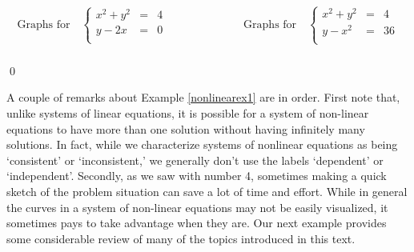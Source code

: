 \begin{ex}
\begin{enumerate}
\[\begin{array}{cc}
\text{Graphs for} \quad \left\{\begin{array}{rcr}  x^2 +y^2 & = & 4 \\ y-2x & = & 0 \\ \end{array} \right.

&

\hspace{1in}

\text{Graphs for} \quad \left\{\begin{array}{rcr}  x^2 +y^2 & = & 4 \\ y-x^2 & = & 36 \\ \end{array} \right. \\

\end{array} \]

\end{enumerate}

\qed

\end{ex}

A couple of remarks about Example \ref{nonlinearex1} are in order.  First note that, unlike systems of linear equations, it is possible for a system of non-linear equations to have more than one solution without having infinitely many solutions.  In fact, while we characterize systems of nonlinear equations as being `consistent' or `inconsistent,' we generally don't use the labels `dependent' or `independent'.  Secondly, as we saw with number 4, sometimes making a quick sketch of the problem situation can save a lot of time and effort.  While in general the curves in a system of non-linear equations may not be easily visualized, it sometimes pays to take advantage when they are.  Our next example provides some considerable review of many of the topics introduced in this text.

